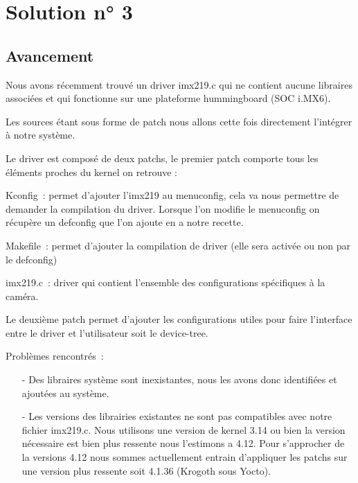 
\chapter{Solution n° 3} %

\label{Chapter4} %


\section{Avancement}

Nous avons récemment trouvé un driver imx219.c qui ne contient aucune libraires
associées et qui fonctionne sur une plateforme hummingboard (SOC i.MX6).

Les sources étant sous forme de patch nous allons cette fois directement l’intégrer à notre système.

Le driver est composé de deux patchs, le premier patch comporte tous les éléments proches du kernel on retrouve :

Kconfig : permet d’ajouter l’imx219 au menuconfig, cela va nous permettre de demander la
compilation du driver. Lorsque l’on modifie le menuconfig on récupère un defconfig
que l’on ajoute en a notre recette.

Makefile : permet d’ajouter la compilation de driver (elle sera activée ou non par le defconfig)

imx219.c : driver qui contient l’ensemble des configurations spécifiques à la caméra.

Le deuxième patch permet d’ajouter les configurations utiles pour faire l’interface entre
le driver et l’utilisateur soit le device-tree.

Problèmes rencontrés :

\begin{itemize}
    \item[-] Des libraires système sont inexistantes, nous les avons donc identifiées et ajoutées au système.
    \item[-] Les versions des librairies existantes ne sont pas compatibles avec notre fichier imx219.c.
    Nous utilisons une version de kernel 3.14 ou bien la version nécessaire est bien plus ressente nous
    l’estimons a 4.12. Pour s’approcher de la versions 4.12 nous sommes actuellement entrain d’appliquer
    les patchs sur une version plus ressente soit 4.1.36 (Krogoth sous Yocto).
\end{itemize}

